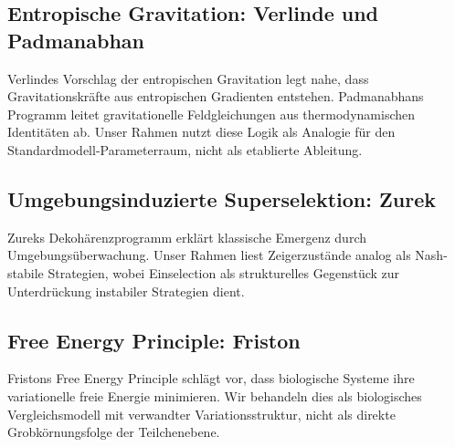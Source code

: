 \documentclass[12pt,a4paper]{article}
\theoremstyle{remark}
\begin{document}
\subsection{Entropische Gravitation: Verlinde und Padmanabhan}

Verlindes Vorschlag der entropischen Gravitation \citep{Verlinde2011} legt nahe, dass Gravitationskr\"afte aus entropischen Gradienten entstehen. Padmanabhans Programm \citep{Padmanabhan2010} leitet gravitationelle Feldgleichungen aus thermodynamischen Identit\"aten ab. Unser Rahmen nutzt diese Logik als Analogie f\"ur den Standardmodell-Parameterraum, nicht als etablierte Ableitung.

\subsection{Umgebungsinduzierte Superselektion: Zurek}

Zureks Dekoh\"arenzprogramm \citep{Zurek2003} erkl\"art klassische Emergenz durch Umgebungs\"uberwachung. Unser Rahmen liest Zeigerzust\"ande analog als Nash-stabile Strategien, wobei Einselection als strukturelles Gegenst\"uck zur Unterdr\"uckung instabiler Strategien dient.

\subsection{Free Energy Principle: Friston}

Fristons Free Energy Principle \citep{Friston2010} schl\"agt vor, dass biologische Systeme ihre variationelle freie Energie minimieren. Wir behandeln dies als biologisches Vergleichsmodell mit verwandter Variationsstruktur, nicht als direkte Grobk\"ornungsfolge der Teilchenebene.
\end{document}

